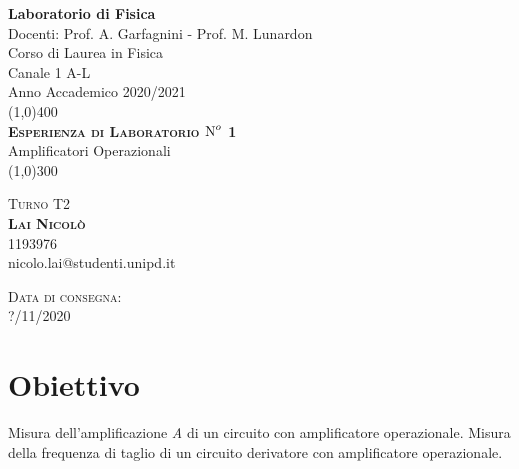 \documentclass[a4paper,11pt]{article}
\begin{document}
	\def\subsectionautorefname{Sezione} \def\subsubsectionautorefname{Sezione}




	\begin{titlepage}
		\begin{center}
			\Huge{\bfseries Laboratorio di Fisica}\\
				
			\LARGE Docenti: Prof. A. Garfagnini - Prof. M. Lunardon \\
			\Large Corso di Laurea in Fisica\\
			\Large Canale 1 A-L\\
			\Large Anno Accademico 2020/2021\\
			[1cm] \line(1,0){400}\\
			[2cm]
				
			\textsc{\huge{\bfseries  Esperienza di Laboratorio $\text N^o$ 1}}\\
			\huge{Amplificatori Operazionali}\\
			[2mm] \line(1,0){300}\\
			[10.5cm]
					
		\end{center}
		
			
			\textsc{\Large Turno T2}\\
			[0.5cm] \textsc{\large {\bfseries Lai Nicolò}} \\ 
			\indent\large 1193976 \\ 
			\indent\large nicolo.lai@studenti.unipd.it\\
			
				
				
		\begin{flushright}
				\textsc{\Large Data di consegna:}\\
				\textsc{\large ?/11/2020}					
		\end{flushright}
				
	\end{titlepage}
\cleardoublepage

\section{Obiettivo}
Misura dell'amplificazione \textit{A} di un circuito con amplificatore operazionale. Misura della frequenza di taglio di un circuito derivatore con
amplificatore operazionale.
\end{document}
